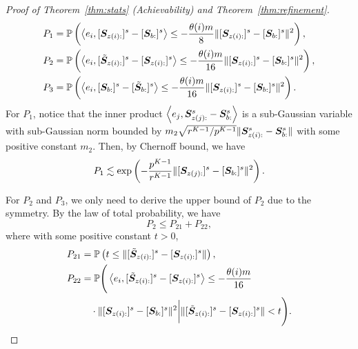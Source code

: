 \documentclass[journal]{IEEEtran}
\theoremstyle{definition}
\theoremstyle{definition}
\newcommand{\of}[1]{\left(#1\right)}
\newcommand{\ang}[1]{\left\langle#1\right\rangle}
\begin{document}
\begin{proof}[Proof of Theorem~\ref{thm:stats} (Achievability) and Theorem~\ref{thm:refinement}]
    \vspace{-0.5cm}
    \small
    \begin{align}
        P_1 &= \bbP \of{ \ang{e_i, [  \mS_{z(i):} ]^s - [ \mS_{b:} ]^s} \leq -\frac{\theta(i)m}{8}  \onormSize{}{ [ \mS_{z(i):}  ]^s - [ \mS_{b:}  ]^s  }^2 }, \\
        P_2 &= \bbP \of{ \ang{e_i, [ \tilde  \mS_{z(i):} ]^s - [ \mS_{z(i):} ]^s} \leq -\frac{\theta(i)m}{16}  \onormSize{}{ [ \mS_{z(i):}  ]^s - [ \mS_{b:}  ]^s  }^2 },\\
        P_3 &= \bbP \of{ \ang{e_i, [  \mS_{b:} ]^s - [\tilde  \mS_{b:} ]^s} \leq -\frac{\theta(i)m}{16}   \onormSize{}{ [ \mS_{z(i):}  ]^s - [ \mS_{b:}  ]^s  }^2 }.
    \end{align}
    \normalsize
    For $P_1$, notice that the inner product $\ang{e_j,\mS_{z(j):}^s - \mS_{b:}^s} $ is a sub-Gaussian variable with sub-Gaussian norm bounded by $m_2 \sqrt{ r^{K-1}/ p^{K-1} } \lVert \bm S_{z(i):}^s -  \bm S_{b:}^s \rVert$ with some positive constant $m_2$. Then, by Chernoff bound, we have  
    \begin{equation}\label{eq:p1_2}
         P_1 \lesssim \exp \of{  - \frac{p^{K-1}}{r^{K-1}}   \onormSize{}{ [ \mS_{z(j):}  ]^s - [ \mS_{b:}  ]^s  }^2 }.
    \end{equation}
    
    For $P_2$ and $P_3$, we only need to derive the upper bound of $P_2$ due to the symmetry. By the law of total probability, we have 
    \begin{equation}\label{eq:p2}
        P_2 \leq P_{21} + P_{22},
    \end{equation}
    where with some positive constant $t>0$,
    \begin{align}
        P_{21}& =  \bbP \of{ t \leq   \onormSize{}{ [ \tilde  \mS_{z(i):} ]^s - [ \mS_{z(i):} ]^s }},\\
        P_{22} &= \bbP \Bigg(  \ang{e_i, [ \tilde  \mS_{z(i):} ]^s - [ \mS_{z(i):} ]^s} \leq -\frac{\theta(i)m}{16} \\
        &\quad \cdot \onormSize{}{ [ \mS_{z(i):}  ]^s - [ \mS_{b:}  ]^s  }^2   \bigg| \onormSize{}{ [ \tilde  \mS_{z(i):} ]^s - [ \mS_{z(i):} ]^s } < t  \Bigg).
    \end{align}
    

\end{proof}
\end{document}
